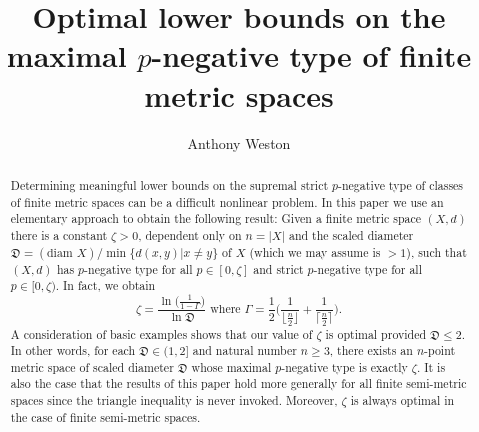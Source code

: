 \documentclass[10pt]{amsart}
\theoremstyle{definition}
\theoremstyle{remark}
\begin{document}
\title[On the (strict) $p$-negative type of finite metric spaces]{Optimal lower bounds
on the maximal $p$-negative type of finite metric spaces}
\author{Anthony Weston}
\address{Department of Mathematics {\&} Statistics, Canisius College,
Buffalo, NY 14208}



\begin{abstract}
Determining meaningful lower bounds on the supremal strict $p$-negative type of classes of finite
metric spaces can be a difficult nonlinear problem. In this paper we use an elementary
approach to obtain the following result: Given a finite metric space $(X,d)$ there is a
constant $\zeta > 0$, dependent only on $n = |X|$ and the scaled diameter
$\mathfrak{D} = (\text{diam } X) / \min \{d(x,y) | x \not= y\}$ of $X$ (which we may
assume is $> 1$),
such that $(X,d)$ has $p$-negative type for all $p \in [0,\zeta]$
and strict $p$-negative type for all $p \in [0,\zeta)$. In fact, we obtain
\[
\zeta =  \frac{\ln \bigl( \frac{1}{1 - \Gamma} \bigl)}{\ln \mathfrak{D}}
\text{ where } \Gamma = \frac{1}{2} \Biggl( \frac{1}{\lfloor \frac{n}{2} \rfloor}
+ \frac{1}{\lceil \frac{n}{2} \rceil} \Biggl).
\]
A consideration of basic examples shows that our value of $\zeta$ is optimal provided $\mathfrak{D} \leq 2$.
In other words, for each $\mathfrak{D} \in (1,2]$ and natural number $n \geq 3$, there exists an $n$-point
metric space of scaled diameter $\mathfrak{D}$ whose maximal $p$-negative type is exactly $\zeta$.
It is also the case that the results
of this paper hold more generally for all finite semi-metric spaces since the triangle inequality is
never invoked. Moreover, $\zeta$ is always optimal in the case of finite semi-metric spaces.
\end{abstract}
\maketitle
\end{document}

